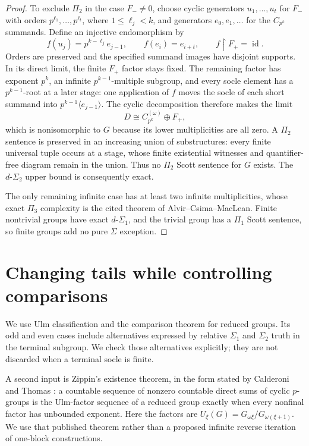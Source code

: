 \documentclass[11pt]{article}
\begin{document}
\begin{proof}
To exclude $\Pi_2$ in the case $F_-\ne0$, choose cyclic generators
$u_1,\ldots,u_t$ for $F_-$ with orders $p^{\ell_1},\ldots,p^{\ell_t}$,
where $1\le\ell_j<k$, and generators $e_0,e_1,\ldots$ for the
$C_{p^k}$ summands. Define an injective endomorphism by
\[
 f(u_j)=p^{k-\ell_j}e_{j-1},\qquad
 f(e_i)=e_{i+t},\qquad f\upharpoonright F_+=\operatorname{id}.
\]
Orders are preserved and the specified summand images have disjoint
supports. In its direct limit, the finite $F_+$ factor stays fixed.
The remaining factor has exponent $p^k$, an infinite
$p^{k-1}$-multiple subgroup, and every socle element has a
$p^{k-1}$-root at a later stage: one application of $f$ moves the socle
of each short summand into $p^{k-1}\langle e_{j-1}\rangle$.
The cyclic decomposition therefore makes the limit
\[
 D\cong C_{p^k}^{(\omega)}\oplus F_+,
\]
which is nonisomorphic to $G$ because its lower multiplicities are all
zero. A $\Pi_2$ sentence is preserved in an increasing union of
substructures: every finite universal tuple occurs at a stage, whose
finite existential witnesses and quantifier-free diagram remain in the
union. Thus no $\Pi_2$ Scott sentence for $G$ exists. The
$d\text{-}\Sigma_2$ upper bound is consequently exact.

The only remaining infinite case has at least two infinite
multiplicities, whose exact $\Pi_3$ complexity is the cited theorem of
Alvir--Csima--MacLean. Finite nontrivial groups have exact
$d\text{-}\Sigma_1$, and the trivial group has a $\Pi_1$ Scott sentence,
so finite groups add no pure $\Sigma$ exception.
\end{proof}


\section{Changing tails while controlling comparisons}
We use Ulm classification and the comparison theorem
\cite[Theorem~4.4]{ACM} for reduced groups. Its odd and even cases
include alternatives expressed by relative $\Sigma_1$ and $\Sigma_2$
truth in the terminal subgroup. We check those alternatives explicitly;
they are not discarded when a terminal socle is finite.

A second input is Zippin's existence theorem, in the form stated by
Calderoni and Thomas \cite[Theorem~4.2]{CT}: a countable sequence of
nonzero countable direct sums of cyclic $p$-groups is the Ulm-factor
sequence of a reduced group exactly when every nonfinal factor has
unbounded exponent. Here the factors are
$U_\xi(G)=G_{\omega\xi}/G_{\omega(\xi+1)}$.
We use that published theorem rather than a proposed infinite reverse
iteration of one-block constructions.
\end{document}
